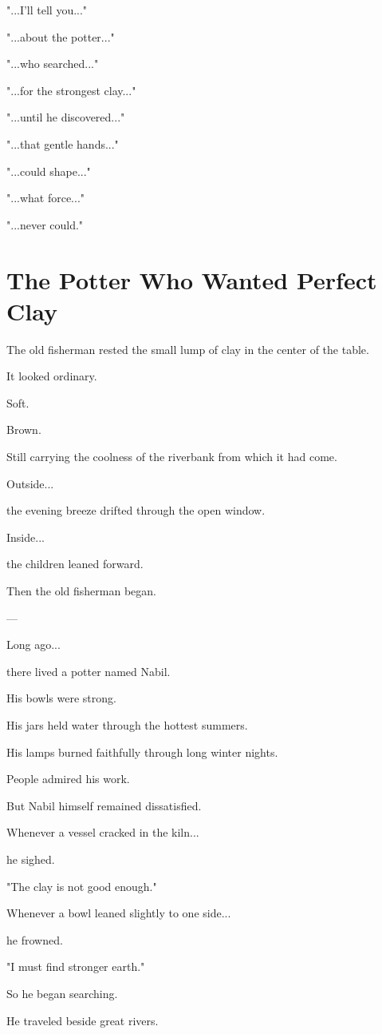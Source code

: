 \documentclass[12pt,openany]{book}
\begin{document}
"...I'll tell you..."

"...about the potter..."

"...who searched..."

"...for the strongest clay..."

"...until he discovered..."

"...that gentle hands..."

"...could shape..."

"...what force..."

"...never could."
\section*{The Potter Who Wanted Perfect Clay}

The old fisherman rested the small lump of clay in the center of the table.

It looked ordinary.

Soft.

Brown.

Still carrying the coolness of the riverbank from which it had come.

Outside...

the evening breeze drifted through the open window.

Inside...

the children leaned forward.

Then the old fisherman began.

---

Long ago...

there lived a potter named Nabil.

His bowls were strong.

His jars held water through the hottest summers.

His lamps burned faithfully through long winter nights.

People admired his work.

But Nabil himself remained dissatisfied.

Whenever a vessel cracked in the kiln...

he sighed.

"The clay is not good enough."

Whenever a bowl leaned slightly to one side...

he frowned.

"I must find stronger earth."

So he began searching.

He traveled beside great rivers.
\end{document}
